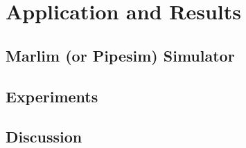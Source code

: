
\chapter{Application and Results} \label{chap:4}


\section{Marlim (or Pipesim) Simulator}




\section{Experiments}




\section{Discussion}





